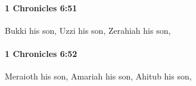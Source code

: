 		\paragraph{1 Chronicles 6:51} %
			\label{1CHRONICLES-6-51}

			Bukki his son, Uzzi his son, Zerahiah his son,


		\paragraph{1 Chronicles 6:52} %
			\label{1CHRONICLES-6-52}

			Meraioth his son, Amariah his son, Ahitub his son,


